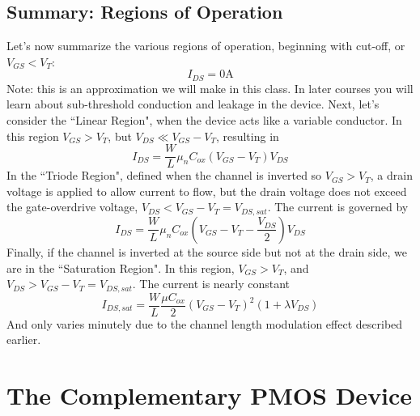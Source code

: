 \subsection{Summary: Regions of Operation}
Let's now summarize the various regions of operation, beginning with cut-off, or $V_{GS} < V_T$:
    \begin{equation}
        I_{DS} = 0\mathrm{A}
    \end{equation}
Note: this is an approximation we will make in this class.  In later courses you will learn about sub-threshold conduction and leakage in the device.  
Next, let's consider the ``Linear Region", when the device acts like a variable conductor.  In this region  $V_{GS} > V_T$, but $V_{DS} \ll V_{GS} - V_T$, resulting in
    \begin{equation}
        {I_{DS}} = \frac{W}{L}{\mu _n}{C_{ox}}({V_{GS}} - {V_T}){V_{DS}}
    \end{equation}
In the ``Triode Region", defined when the channel is inverted so $V_{GS} > V_T$, a drain voltage is applied to allow current to flow, but the drain voltage does not exceed the gate-overdrive voltage, $V_{DS} < V_{GS} - V_T = V_{DS,sat}$.  The current is governed by
    \begin{equation}
        {I_{DS}} = \frac{W}{L}{\mu _n}{C_{ox}}({V_{GS}} - {V_T} - \frac{{{V_{DS}}}}{2}){V_{DS}}
    \end{equation}
Finally, if the channel is inverted at the source side but not at the drain side, we are in the ``Saturation Region".  In this region, $V_{GS} > V_T$, and $V_{DS} > V_{GS} - V_T = V_{DS,sat}$.  The current is nearly constant
    \begin{equation}
        {I_{DS,sat}} = \frac{W}{L}\frac{{\mu {C_{ox}}}}{2}{({V_{GS}} - {V_T})^2}(1 + \lambda {V_{DS}})
    \end{equation}
And only varies minutely due to the channel length modulation effect described earlier. 
\section{The Complementary PMOS Device}
